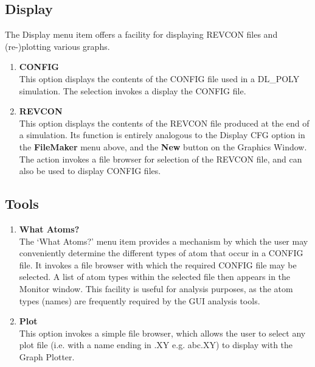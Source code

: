 \subsection{Display}
The Display menu item offers a facility for displaying REVCON files
and (re-)plotting various graphs.
\begin{enumerate}
\item {\bf CONFIG}\\
This option displays the contents of the CONFIG file used in a DL\_POLY
simulation. The selection invokes a display the CONFIG file.
\item {\bf REVCON}\\
This option displays the contents of the REVCON file produced at the
end of a \DD{} simulation. Its function is entirely analogous to the
Display CFG option in the {\bf FileMaker} menu above, and the {\bf
New} button on the Graphics Window. The action invokes a file browser
for selection of the REVCON file, and can also be used to display
CONFIG files.
\end{enumerate}

\subsection{Tools}

\label{whatatoms}
\begin{enumerate}
\item {\bf What Atoms?}\\
The `What Atoms?' menu item provides a mechanism by which the user may
conveniently determine the different types of atom that occur in a
CONFIG file. It invokes a file browser with which the required CONFIG
file may be selected. A list of atom types within the selected file
then appears in the Monitor window. This facility is useful for
analysis purposes, as the atom types (names) are frequently required
by the GUI analysis tools.
\item {\bf Plot}\\
This option invokes a simple file browser, which allows the user to select
any plot file (i.e. with a name ending in .XY  e.g. abc.XY) to display with
the Graph Plotter.
\end{enumerate}

